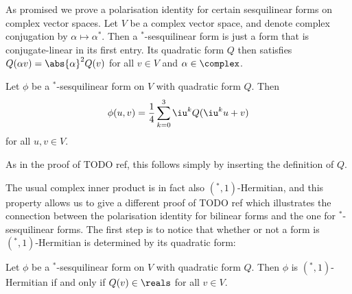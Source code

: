 \documentclass[a4paper, 11pt]{memoir}
\theoremstyle{plaincustomnumber}
\theoremstyle{changedotbreakcustomnumber}
\begin{document}
\newpar

As promised we prove a polarisation identity for certain sesquilinear forms on complex vector spaces. Let $V$ be a complex vector space, and denote complex conjugation by $\alpha \mapsto \alpha^*$. Then a ${}^*$-sesquilinear form is just a form that is conjugate-linear in its first entry. Its quadratic form $Q$ then satisfies $Q(\alpha v) = \abs{\alpha}^2 Q(v)$ for all $v \in V$ and $\alpha \in \complex$.

\begin{propositionnoproof}
    Let $\phi$ be a ${}^*$-sesquilinear form on $V$ with quadratic form $Q$. Then
    \begin{equation*}
        \phi(u,v)
            = \frac{1}{4} \sum_{k=0}^3 \iu^k Q(\iu^k u + v)
    \end{equation*}
    for all $u,v \in V$.
\end{propositionnoproof}
%
As in the proof of TODO ref, this follows simply by inserting the definition of $Q$.

The usual complex inner product is in fact also $({}^*,1)$-Hermitian, and this property allows us to give a different proof of TODO ref which illustrates the connection between the polarisation identity for bilinear forms and the one for ${}^*$-sesquilinear forms. The first step is to notice that whether or not a form is $({}^*,1)$-Hermitian is determined by its quadratic form:
%
\begin{lemma}
    Let $\phi$ be a ${}^*$-sesquilinear form on $V$ with quadratic form $Q$. Then $\phi$ is $({}^*,1)$-Hermitian if and only if $Q(v) \in \reals$ for all $v \in V$.
\end{lemma}
\end{document}
